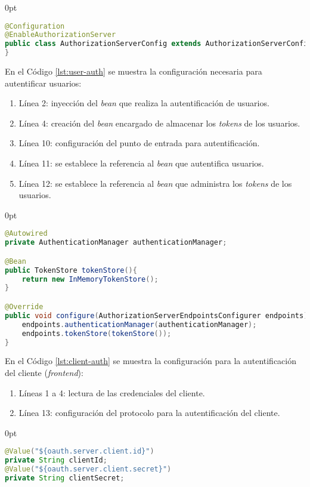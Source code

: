 \begin{enumerate}
\begin{adjustwidth}{\listingfixwidth}{0pt}
\begin{lstlisting}[language=Java, caption={Clase de autentificación de usuarios.}, captionpos=b, label={lst:enable-auth-server}]
@Configuration
@EnableAuthorizationServer
public class AuthorizationServerConfig extends AuthorizationServerConfigurerAdapter{
}
\end{lstlisting}
\end{adjustwidth}
	En el Código \ref{lst:user-auth} se muestra la configuración necesaria para autentificar usuarios:
	\begin{enumerate}
		\item Línea 2: inyección del \textit{bean} que realiza la autentificación de usuarios.
		\item Línea 4: creación del \textit{bean} encargado de almacenar los \textit{tokens} de los usuarios.
		\item Línea 10: configuración del punto de entrada para autentificación.
		\item Línea 11: se establece la referencia al \textit{bean} que autentifica usuarios.
		\item Línea 12: se establece la referencia al \textit{bean} que administra los \textit{tokens} de los usuarios.
	\end{enumerate}
\begin{adjustwidth}{\listingfixwidth}{0pt}
\begin{lstlisting}[language=Java, caption={Configuración de autentificación de usuarios.}, captionpos=b, label={lst:user-auth}]
@Autowired
private AuthenticationManager authenticationManager;

@Bean
public TokenStore tokenStore(){
	return new InMemoryTokenStore();
}

@Override
public void configure(AuthorizationServerEndpointsConfigurer endpoints) throws Exception{
	endpoints.authenticationManager(authenticationManager);
	endpoints.tokenStore(tokenStore());
}
\end{lstlisting}
\end{adjustwidth}
	En el Código \ref{lst:client-auth} se muestra la configuración para la autentificación del cliente (\textit{frontend}):
	\begin{enumerate}
		\item Líneas 1 a 4: lectura de las credenciales del cliente.
		\item Línea 13: configuración del protocolo para la autentificación del cliente. 
	\end{enumerate}
\begin{adjustwidth}{\listingfixwidth}{0pt}
\begin{lstlisting}[language=Java, caption={Clase de autentificación de cliente.}, captionpos=b, label={lst:client-auth}]
@Value("${oauth.server.client.id}")
private String clientId;
@Value("${oauth.server.client.secret}")
private String clientSecret;


\end{lstlisting}
\end{adjustwidth}
\end{enumerate}
